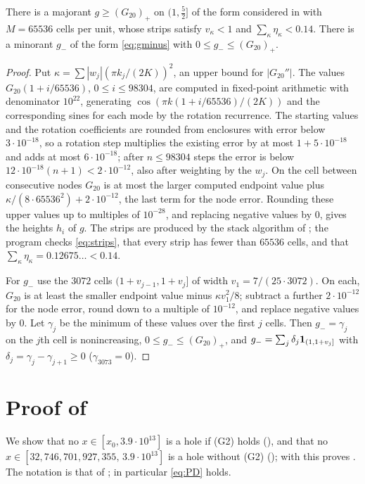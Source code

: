 \documentclass[11pt,colorlinks]{charlie}
\newcommand{\xo}{x_0}
\begin{document}
\begin{lemma}\label{lem:twenty-steps}
There is a majorant $g\ge(G_{20})_+$ on $(1,\frac52]$ of the form considered in  with $M=65536$ cells per unit, whose strips satisfy $v_\kappa<1$ and $\sum_\kappa\eta_\kappa<0.14$. There is a minorant $g_-$ of the form \eqref{eq:gminus} with $0\le g_-\le(G_{20})_+$.
\end{lemma}
\begin{proof}
Put $\kappa=\sum|w_j|(\pi k_j/(2K))^2$, an upper bound for $|G_{20}''|$. The values $G_{20}(1+i/65536)$, $0\le i\le98304$, are computed in fixed-point arithmetic with denominator $10^{22}$, generating $\cos(\pi k(1+i/65536)/(2K))$ and the corresponding sines for each mode by the rotation recurrence. The starting values and the rotation coefficients are rounded from enclosures with error below $3\cdot10^{-18}$, so a rotation step multiplies the existing error by at most $1+5\cdot10^{-18}$ and adds at most $6\cdot10^{-18}$; after $n\le98304$ steps the error is below $12\cdot10^{-18}(n+1)<2\cdot10^{-12}$, also after weighting by the $w_j$. On the cell between consecutive nodes $G_{20}$ is at most the larger computed endpoint value plus $\kappa/(8\cdot65536^2)+2\cdot10^{-12}$, the last term for the node error. Rounding these upper values up to multiples of $10^{-28}$, and replacing negative values by $0$, gives the heights $h_i$ of $g$. The strips are produced by the stack algorithm of ; the program checks \eqref{eq:strips}, that every strip has fewer than $65536$ cells, and that $\sum_\kappa\eta_\kappa=0.12675\ldots<0.14$.

For $g_-$ use the $3072$ cells $(1+v_{j-1},1+v_j]$ of width $v_1=7/(25\cdot3072)$. On each, $G_{20}$ is at least the smaller endpoint value minus $\kappa v_1^2/8$; subtract a further $2\cdot10^{-12}$ for the node error, round down to a multiple of $10^{-12}$, and replace negative values by $0$. Let $\gamma_j$ be the minimum of these values over the first $j$ cells. Then $g_-=\gamma_j$ on the $j$th cell is nonincreasing, $0\le g_-\le(G_{20})_+$, and $g_-=\sum_j\delta_j\mathbf{1}_{(1,1+v_j]}$ with $\delta_j=\gamma_j-\gamma_{j+1}\ge0$ ($\gamma_{3073}=0$).
\end{proof}

\section{Proof of }\label{sec:outer}
We show that no $x\in[\xo,3.9\cdot10^{13}]$ is a hole if (G2) holds (), and that no $x\in[32{,}746{,}701{,}927{,}355,\,3.9\cdot10^{13}]$ is a hole without (G2) (); with  this proves . The notation is that of ; in particular \eqref{eq:PD} holds.
\end{document}
